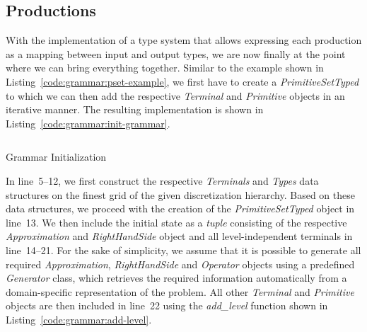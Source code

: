 \subsection{Productions}
With the implementation of a type system that allows expressing each production as a mapping between input and output types, we are now finally at the point where we can bring everything together.
Similar to the example shown in Listing~\ref{code:grammar:pset-example}, we first have to create a \emph{PrimitiveSetTyped} to which we can then add the respective \emph{Terminal} and \emph{Primitive} objects in an iterative manner.
The resulting implementation is shown in Listing~\ref{code:grammar:init-grammar}.
\begin{listing}
	\inputminted[linenos]{python}{evostencils/grammar/init_grammar.py}
	\caption{Grammar Initialization}
	\label{code:grammar:init-grammar}
\end{listing}
In line~5--12, we first construct the respective \emph{Terminals} and \emph{Types} data structures on the finest grid of the given discretization hierarchy.
Based on these data structures, we proceed with the creation of the \emph{PrimitiveSetTyped} object in line~13.
We then include the initial state as a \emph{tuple} consisting of the respective \emph{Approximation} and \emph{RightHandSide} object and all level-independent terminals in line~14--21.
For the sake of simplicity, we assume that it is possible to generate all required \emph{Approximation}, \emph{RightHandSide} and \emph{Operator} objects using a predefined \emph{Generator} class, which retrieves the required information automatically from a domain-specific representation of the problem.
All other \emph{Terminal} and \emph{Primitive} objects are then included in line~22 using the \emph{add\_level} function shown in Listing~\ref{code:grammar:add-level}.

